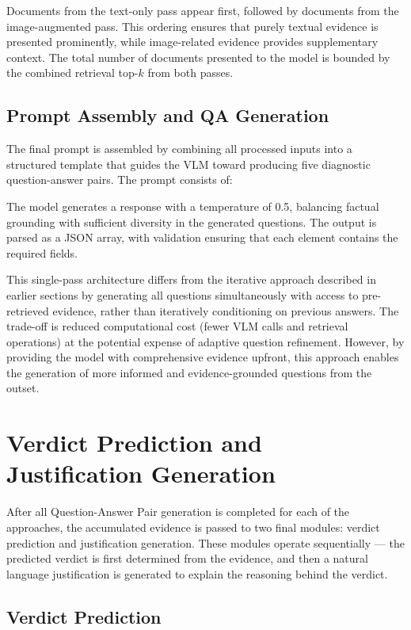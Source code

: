 Documents from the text-only pass appear first, followed by documents from the image-augmented pass. This ordering ensures that purely textual evidence is presented prominently, while image-related evidence provides supplementary context. The total number of documents presented to the model is bounded by the combined retrieval top-$k$ from both passes.

\subsection{Prompt Assembly and QA Generation}

The final prompt is assembled by combining all processed inputs into a structured template that guides the VLM toward producing five diagnostic question-answer pairs. The prompt consists of:


The model generates a response with a temperature of 0.5, balancing factual grounding with sufficient diversity in the generated questions. The output is parsed as a JSON array, with validation ensuring that each element contains the required fields.

This single-pass architecture differs from the iterative approach described in earlier sections by generating all questions simultaneously with access to pre-retrieved evidence, rather than iteratively conditioning on previous answers. The trade-off is reduced computational cost (fewer VLM calls and retrieval operations) at the potential expense of adaptive question refinement. However, by providing the model with comprehensive evidence upfront, this approach enables the generation of more informed and evidence-grounded questions from the outset.

\section{Verdict Prediction and Justification Generation}

After all Question-Answer Pair generation is completed for each of the approaches, the accumulated evidence is passed to two final modules: verdict prediction and justification generation. These modules operate sequentially — the predicted verdict is first determined from the evidence, and then a natural language justification is generated to explain the reasoning behind the verdict.

\subsection{Verdict Prediction}

